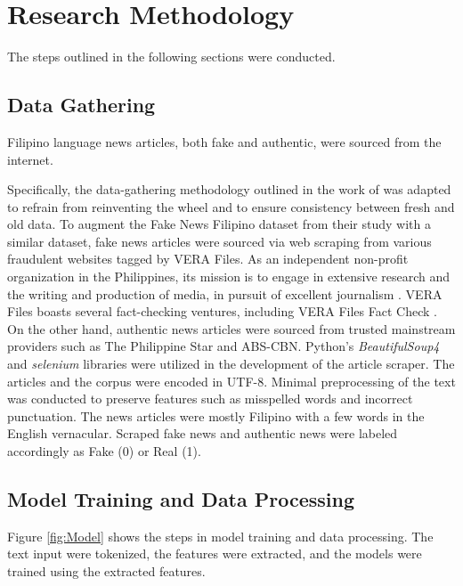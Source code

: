 \chapter{Research Methodology}

The steps outlined in the following sections were conducted.

\section{Data Gathering}

Filipino language news articles, both fake and authentic, were sourced from the internet.

Specifically, the data-gathering methodology outlined in the work of \cite{cruz2020localization} was adapted to refrain from reinventing the wheel and to ensure consistency between fresh and old data. To augment the Fake News Filipino dataset from their study with a similar dataset, fake news articles were sourced via web scraping from various fraudulent websites tagged by VERA Files. As an independent non-profit organization in the Philippines, its mission is to engage in extensive research and the writing and production of media, in pursuit of excellent journalism \cite{verafiles-about}. VERA Files boasts several fact-checking ventures, including VERA Files Fact Check \cite{verafiles-fact-check}. On the other hand, authentic news articles were sourced from trusted mainstream providers such as The Philippine Star and ABS-CBN. Python's \textit{BeautifulSoup4} and \textit{selenium} libraries were utilized in the development of the article scraper. The articles and the corpus were encoded in UTF-8. Minimal preprocessing of the text was conducted to preserve features such as misspelled words and incorrect punctuation. The news articles were mostly Filipino with a few words in the English vernacular. Scraped fake news and authentic news were labeled accordingly as Fake (0) or Real (1).

\section{Model Training and Data Processing}
\label{sec:ModelTraining}

Figure \ref{fig:Model} shows the steps in model training and data processing. The text input were tokenized, the features were extracted, and the models were trained using the extracted features.

